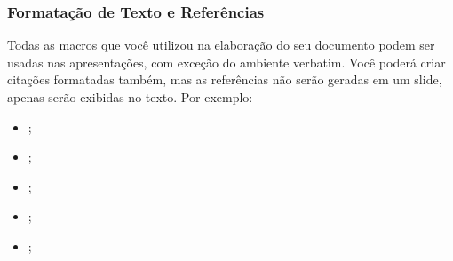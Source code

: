 \begin{frame}

    \frametitle{Formatação de Texto e Referências}
    
    Todas as macros que você utilizou na elaboração do seu documento podem ser usadas nas apresentações, com exceção do ambiente verbatim. Você poderá criar citações formatadas também, mas as referências não serão geradas em um slide, apenas serão exibidas no texto. Por exemplo:
    
    \begin{itemize}
        \item \cite{Abedi2014, Agaisse1995};
        \item \cite{AgapitoTenfen2014, BtNomenclature2016, Nelson2014};
        \item {};
        \item {};
        \item {};
    \end{itemize}
         
\end{frame}